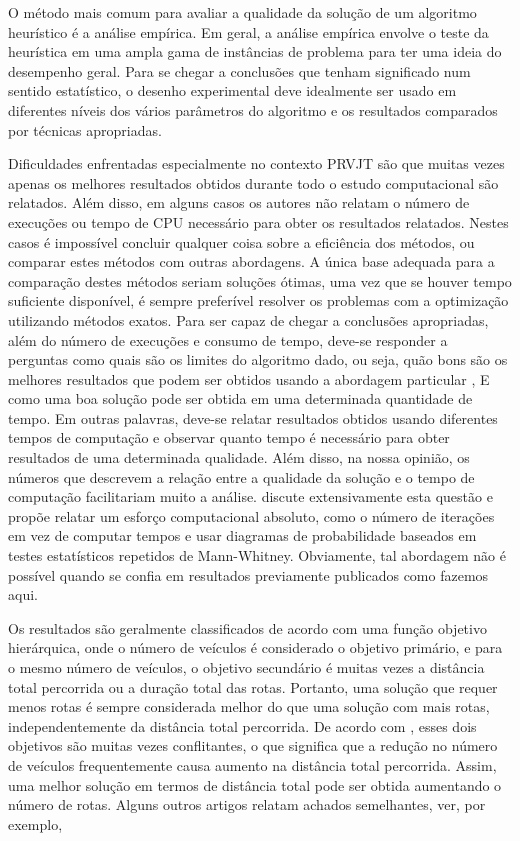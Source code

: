O método mais comum para avaliar a qualidade da solução de um algoritmo heurístico é a análise empírica. Em geral, a análise empírica envolve o teste da heurística em uma ampla gama de instâncias de problema para ter uma ideia do desempenho geral. Para se chegar a conclusões que tenham significado num sentido estatístico, o desenho experimental deve idealmente ser usado em diferentes níveis dos vários parâmetros do algoritmo e os resultados comparados por técnicas apropriadas.


Dificuldades enfrentadas especialmente no contexto PRVJT são que muitas vezes apenas os melhores resultados obtidos durante todo o estudo computacional são relatados. Além disso, em alguns casos os autores não relatam o número de execuções ou tempo de CPU necessário para obter os resultados relatados. Nestes casos é impossível concluir qualquer coisa sobre a eficiência dos métodos, ou comparar estes métodos com outras abordagens. A única base adequada para a comparação destes métodos seriam soluções ótimas, uma vez que se houver tempo suficiente disponível, é sempre preferível resolver os problemas com a optimização utilizando métodos exatos. Para ser capaz de chegar a conclusões apropriadas, além do número de execuções e consumo de tempo, deve-se responder a perguntas como quais são os limites do algoritmo dado, ou seja, quão bons são os melhores resultados que podem ser obtidos usando a abordagem particular , E como uma boa solução pode ser obtida em uma determinada quantidade de tempo. Em outras palavras, deve-se relatar resultados obtidos usando diferentes tempos de computação e observar quanto tempo é necessário para obter resultados de uma determinada qualidade. Além disso, na nossa opinião, os números que descrevem a relação entre a qualidade da solução e o tempo de computação facilitariam muito a análise. \cite{taillard01} discute extensivamente esta questão e propõe relatar um esforço computacional absoluto, como o número de iterações em vez de computar tempos e usar diagramas de probabilidade baseados em testes estatísticos repetidos de Mann-Whitney. Obviamente, tal abordagem não é possível quando se confia em resultados previamente publicados como fazemos aqui.




Os resultados são geralmente classificados de acordo com uma função objetivo hierárquica, onde o número de veículos é considerado o objetivo primário, e para o mesmo número de veículos, o objetivo secundário é muitas vezes a distância total percorrida ou a duração total das rotas. Portanto, uma solução que requer menos rotas é sempre considerada melhor do que uma solução com mais rotas, independentemente da distância total percorrida. De acordo com \cite{braysy01}, esses dois objetivos são muitas vezes conflitantes, o que significa que a redução no número de veículos frequentemente causa aumento na distância total percorrida. Assim, uma melhor solução em termos de distância total pode ser obtida aumentando o número de rotas. Alguns outros artigos relatam achados semelhantes, ver, por exemplo,\cite{caseau99}
 
